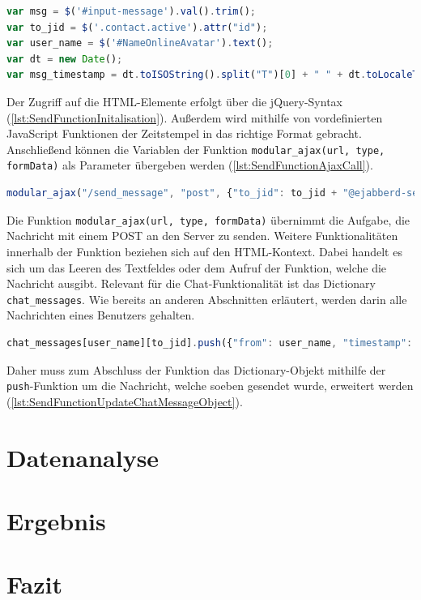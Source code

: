\documentclass[a4paper,titlepage,halfparskip,12pt]{scrreprt}
\begin{document}
\begin{onehalfspacing}
\begin{lstlisting}[language=Javascript,caption=Initialisierung der Variablen zum Senden einer Nachricht ,label={lst:SendFunctionInitalisation}]
var msg = $('#input-message').val().trim();
var to_jid = $('.contact.active').attr("id");
var user_name = $('#NameOnlineAvatar').text();
var dt = new Date();
var msg_timestamp = dt.toISOString().split("T")[0] + " " + dt.toLocaleTimeString().substring(0,5); 
\end{lstlisting}
Der Zugriff auf die \ac{HTML}-Elemente erfolgt über die jQuery-Syntax (\autoref{lst:SendFunctionInitalisation}). Außerdem wird mithilfe von vordefinierten JavaScript Funktionen der Zeitstempel in das richtige Format gebracht. Anschließend können die Variablen der Funktion \texttt{modular\_ajax(url, type, formData)} als Parameter übergeben werden (\autoref{lst:SendFunctionAjaxCall}).
\begin{lstlisting}[language=Javascript,caption=Aufruf der Funktion \texttt{modular\_ajax(url, type, formData)} mit allen Parametern  ,label={lst:SendFunctionAjaxCall}]
modular_ajax("/send_message", "post", {"to_jid": to_jid + "@ejabberd-server", "from_jid": user_name+"@ejabberd-server", "msg_subject": "", "msg_body": msg, "msg_type": "chat"});
\end{lstlisting}
Die Funktion \texttt{modular\_ajax(url, type, formData)} übernimmt die Aufgabe, die Nachricht mit einem POST an den Server zu senden. Weitere Funktionalitäten innerhalb der Funktion beziehen sich auf den \ac{HTML}-Kontext. Dabei handelt es sich um das Leeren des Textfeldes oder dem Aufruf der Funktion, welche die Nachricht ausgibt. Relevant für die Chat-Funktionalität ist das Dictionary \texttt{chat\_messages}. Wie bereits an anderen Abschnitten erläutert, werden darin alle Nachrichten eines Benutzers gehalten. 
\begin{lstlisting}[language=Javascript,caption=Nachricht in Dictionary einfügen  ,label={lst:SendFunctionUpdateChatMessageObject}]
chat_messages[user_name][to_jid].push({"from": user_name, "timestamp": msg_timestamp, "txt": msg, "type": "chat"});
\end{lstlisting}
Daher muss zum Abschluss der Funktion das Dictionary-Objekt mithilfe der \texttt{push}-Funktion um die Nachricht, welche soeben gesendet wurde, erweitert werden (\autoref{lst:SendFunctionUpdateChatMessageObject}).
\newpage

\chapter{Datenanalyse}
\label{chap:Datenanalyse}

\newpage

\chapter{Ergebnis}
\label{chap:Ergebnis}

\newpage

\chapter{Fazit}
\label{chap:Fazit}


\end{onehalfspacing}
\newpage
\end{document}
